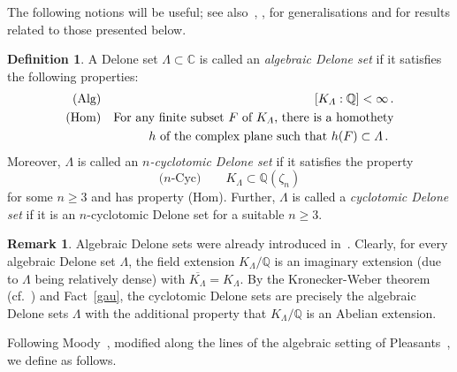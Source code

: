 \documentclass[a4paper]{amsart}
\theoremstyle{definition}
\newtheorem{defi}[theorem]{Definition}
\newtheorem{rem}[theorem]{Remark}
\numberwithin{equation}{section}
\numberwithin{theorem}{section}
\begin{document}
 The following notions will
be useful; see also~\cite{H3}, \cite{H4}, \cite{H5} for
generalisations and for results related to
those presented below.

\begin{defi}\label{algdeldef}
A Delone set $\varLambda\subset{\mathbb{C}}$ is called an {\em algebraic Delone
  set} if it satisfies the following properties:
\begin{eqnarray*}
\mbox{(Alg)}&&[K_{\varLambda}:{\mathbb{Q}}]<\infty\,.\\
\mbox{(Hom)}&&\mbox{For any finite subset $F$ of $K_{\varLambda}$, there is a
homothety}\\&&\mbox{$h$ of the complex plane such that $h(F)\subset \varLambda$\,. 
}
\end{eqnarray*}
Moreover, $\varLambda$ is called an {\em $n$-cyclotomic
  Delone set} if it satisfies the property
$$\mbox{($n$-Cyc)}\quad\quad K_{\varLambda}\subset{\mathbb{Q}}(\zeta_n)$$
for some $n\geq 3$
and has property (Hom).  Further,
$\varLambda$ is called a {\em cyclotomic Delone set} if it is an
$n$-cyclotomic Delone set for a suitable $n\geq 3$.
\end{defi} 

\begin{rem}\label{remalg}
Algebraic Delone
sets were already introduced in~\cite[Definition
4.1]{H5}. Clearly, for every algebraic Delone set $\varLambda$, the
field 
extension 
$K_{\varLambda}/{\mathbb{Q}}$ is an imaginary extension (due to $\varLambda$
being relatively dense) with $\overline{K_{\varLambda}}=K_{\varLambda}$. By the Kronecker-Weber theorem (cf.~\cite[Thm.~
14.1]{Wa}) and Fact~\ref{gau}, the cyclotomic Delone sets are precisely the algebraic
Delone sets $\varLambda$ with the additional property that
$K_{\varLambda}/{\mathbb{Q}}$ is an Abelian extension. 
\end{rem}

Following Moody~\cite{Moody}, modified along the lines of the algebraic setting of Pleasants~\cite{PABP}, we
define as follows.
\end{document}
